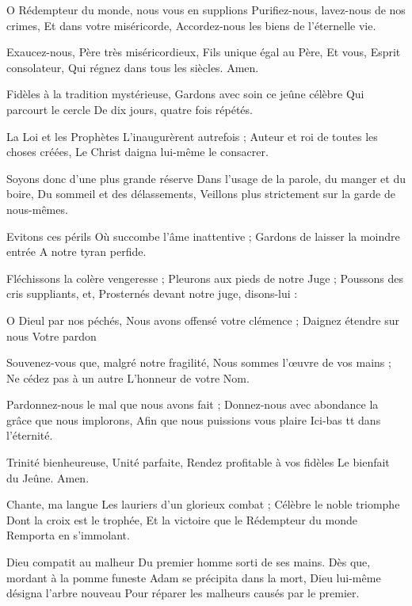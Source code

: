 \documentclass[psautier_nocturne_fr.tex]{subfiles}
\begin{document}
O Rédempteur du monde, nous vous en supplions
Purifiez-nous, lavez-nous de nos crimes,
Et dans votre miséricorde,
Accordez-nous les biens de l'éternelle vie.

Exaucez-nous, Père très miséricordieux,
Fils unique égal au Père,
Et vous, Esprit consolateur,
Qui régnez dans tous les siècles.
Amen.


Fidèles à la tradition mystérieuse,
Gardons avec soin ce jeûne célèbre
Qui parcourt le cercle
De dix jours, quatre fois répétés.

La Loi et les Prophètes
L'inaugurèrent autrefois ;
Auteur et roi de toutes les choses créées,
Le Christ daigna lui-même le consacrer.

Soyons donc d'une plus grande réserve
Dans l'usage de la parole, du manger et du boire,
Du sommeil et des délassements,
Veillons plus strictement sur la garde de nous-mêmes.

Evitons ces périls
Où succombe l'âme inattentive ;
Gardons de laisser la moindre entrée
A notre tyran perfide.

Fléchissons la colère vengeresse ;
Pleurons aux pieds de notre Juge ;
Poussons des cris suppliants, et,
Prosternés devant notre juge, disons-lui :

O Dieul par nos péchés,
Nous avons offensé votre clémence ;
Daignez étendre sur nous
Votre pardon

Souvenez-vous que, malgré notre fragilité,
Nous sommes l'œuvre de vos mains ;
Ne cédez pas à un autre
L'honneur de votre Nom.

Pardonnez-nous le mal que nous avons fait ;
Donnez-nous avec abondance la grâce que nous implorons,
Afin que nous puissions vous plaire
Ici-bas tt dans l'éternité.

Trinité bienheureuse,
Unité parfaite,
Rendez profitable à vos fidèles
Le bienfait du Jeûne.
Amen.


Chante, ma langue
Les lauriers d'un glorieux combat ;
Célèbre le noble triomphe
Dont la croix est le trophée,
Et la victoire que le Rédempteur du monde
Remporta en s'immolant.

Dieu compatit au malheur
Du premier homme sorti de ses mains.
Dès que, mordant à la pomme funeste
Adam se précipita dans la mort,
Dieu lui-même désigna l'arbre nouveau
Pour réparer les malheurs causés par le premier.
\end{document}
